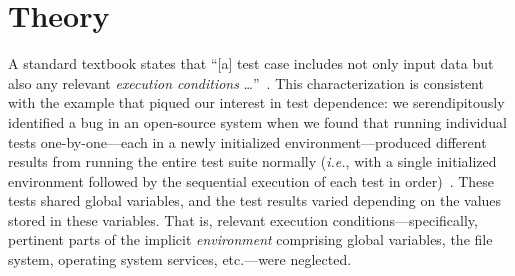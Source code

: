 
\section{Theory}
\label{sec:formalism}


A standard textbook 
states that ``[a] test case includes not only input data but
also any relevant \emph{execution conditions}
\dots''~\cite[p.~152, emphasis added]{pezze-young:2007}.   
This characterization is
consistent with the example that 
 piqued our interest in test dependence: we seren\-dip\-itously identified a bug in an open-source
system when we found that running individual tests one-by-one---each
in a newly initialized environment---produced different
results from running the entire test suite normally (\emph{i.e.}, with a single initialized environment followed by
the sequential execution of each test in order)~\cite{DBLP:conf/sigsoft/MusluSW11}.  These tests
shared global variables, and the test results varied depending on the
values stored in these variables.  That is, relevant execution conditions---specifically, pertinent parts
of the implicit \emph{environment} comprising global variables, the file system, operating system services, etc.---were neglected.

